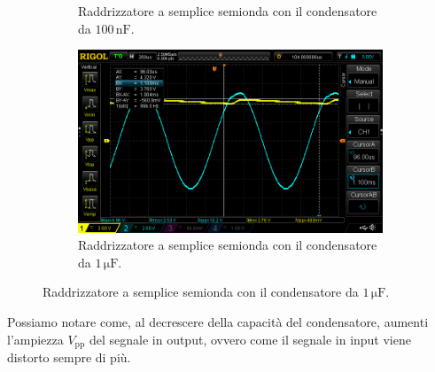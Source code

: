 \documentclass[a4paper]{article}
\begin{document}
{{\begin{figure}[h!]
\begin{subfigure}{0.4\textwidth}
						\caption{Raddrizzatore a semplice semionda con il condensatore da $ 100 \, \mathrm{nF} $.}
					\end{subfigure}
					\begin{subfigure}{1\textwidth}
						\centering
						\includegraphics[scale=0.4]{raddrizzatoreASempliceSemiondaDiodo1micro}
						\caption{Raddrizzatore a semplice semionda con il condensatore da $ 1 \, \mathrm{\mu F} $.}
					\end{subfigure}
					\label{fig:raddrizzatoreASempliceSemiondaDiodo}
				\end{figure}
				\newpage
				Possiamo notare come, al decrescere della capacità del condensatore, aumenti l'ampiezza $ V_{\mathrm{pp}} $ del segnale in output, ovvero come il segnale in input viene distorto sempre di più.
}}
\end{document}
